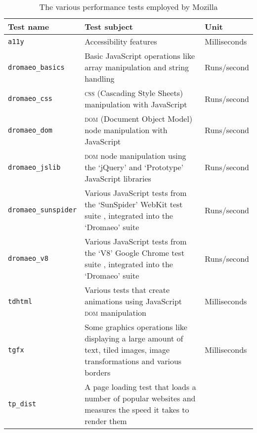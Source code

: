 \begin{table}[tbp]
    \centering
    \caption{The various performance tests employed by Mozilla}
    \label{tab:bg:tests}
    \footnotesize
    \renewcommand{\arraystretch}{1.3}
    \begin{tabular}{l >{\RaggedRight}p{7cm} l}
        \toprule
        Test name & Test subject & Unit \\
        \midrule
        \texttt{a11y}
            & Accessibility features
            & Milliseconds \\
        \texttt{dromaeo\_basics}
            & Basic JavaScript operations like array manipulation and string
              handling
            & Runs\slash second \\
        \texttt{dromaeo\_css}
            & \textsc{css} (Cascading Style Sheets) manipulation with JavaScript
            & Runs\slash second \\
        \texttt{dromaeo\_dom}
            & \textsc{dom} (Document Object Model) node manipulation with
              JavaScript
            & Runs\slash second \\
        \texttt{dromaeo\_jslib}
            & \textsc{dom} node manipulation using the `jQuery' and `Prototype'
              JavaScript libraries
            & Runs\slash second \\
        \texttt{dromaeo\_sunspider}
            & Various JavaScript tests from the `SunSpider' WebKit test suite
              \citep{stachowiak_announcing_2007}, integrated into the `Dromaeo'
              suite
            & Runs\slash second \\
        \texttt{dromaeo\_v8}
            & Various JavaScript tests from the `V8' Google Chrome test suite
              \citep{google_inc._v8_2008}, integrated into the `Dromaeo' suite
            & Runs\slash second \\
        \texttt{tdhtml}
            & Various tests that create animations using JavaScript \textsc{dom}
              manipulation
            & Milliseconds \\
        \texttt{tgfx}
            & Some graphics operations like displaying a large amount of text,
              tiled images, image transformations and various borders
            & Milliseconds \\
        \texttt{tp\_dist}
            & A page loading test that loads a number of popular websites and
              measures the speed it takes to render them

\end{tabular}
\end{table}
